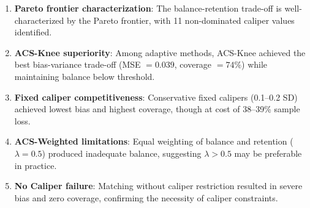 \begin{enumerate}
    \item \textbf{Pareto frontier characterization}: The balance-retention trade-off is well-characterized by the Pareto frontier, with 11 non-dominated caliper values identified.
    
    \item \textbf{ACS-Knee superiority}: Among adaptive methods, ACS-Knee achieved the best bias-variance trade-off (MSE $= 0.039$, coverage $= 74\%$) while maintaining balance below threshold.
    
    \item \textbf{Fixed caliper competitiveness}: Conservative fixed calipers (0.1--0.2 SD) achieved lowest bias and highest coverage, though at cost of 38--39\% sample loss.
    
    \item \textbf{ACS-Weighted limitations}: Equal weighting of balance and retention ($\lambda = 0.5$) produced inadequate balance, suggesting $\lambda > 0.5$ may be preferable in practice.
    
    \item \textbf{No Caliper failure}: Matching without caliper restriction resulted in severe bias and zero coverage, confirming the necessity of caliper constraints.
\end{enumerate}

